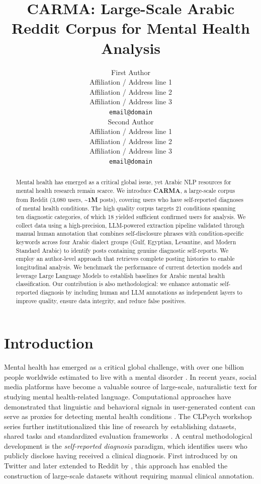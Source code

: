 \documentclass[11pt]{article}
\title{CARMA: Large-Scale Arabic Reddit Corpus for Mental Health Analysis}
\author{First Author \\
  Affiliation / Address line 1 \\
  Affiliation / Address line 2 \\
  Affiliation / Address line 3 \\
  \texttt{email@domain} \\\And
  Second Author \\
  Affiliation / Address line 1 \\
  Affiliation / Address line 2 \\
  Affiliation / Address line 3 \\
  \texttt{email@domain} \\}
\begin{document}
\maketitle
\begin{abstract}
Mental health has emerged as a critical global issue, yet Arabic NLP resources for mental health research remain scarce. We introduce \textbf{CARMA}, a large-scale corpus from Reddit (3,080 users, \textbf{\textasciitilde1M} posts), covering users who have self-reported diagnoses of mental health conditions. The high quality corpus targets 21 conditions spanning ten diagnostic categories, of which 18 yielded sufficient confirmed users for analysis. We collect data using a high-precision, LLM-powered extraction pipeline validated through manual human annotation that combines self-disclosure phrases with condition-specific keywords across four Arabic dialect groups (Gulf, Egyptian, Levantine, and Modern Standard Arabic) to identify posts containing genuine diagnostic self-reports. We employ an author-level approach that retrieves complete posting histories to enable longitudinal analysis. We benchmark the performance of current detection models and leverage Large Language Models to establish baselines for Arabic mental health classification. Our contribution is also methodological: we enhance automatic self-reported diagnosis by including human and LLM annotations as independent layers to improve quality, ensure data integrity, and reduce false positives.\end{abstract}



\section{Introduction}
\label{sec:introduction}
Mental health has emerged as a critical global challenge, with over one billion
people worldwide estimated to live with a mental disorder
\cite{who2025mental}. In recent years, social media platforms have become a valuable source of
large-scale, naturalistic text for studying mental health-related language.
Computational approaches have demonstrated that linguistic and behavioral signals
in user-generated content can serve as proxies for detecting mental health
conditions \cite{de2013predicting, chancellor2020methods}. The CLPsych workshop
series further institutionalized this line of research by establishing datasets, shared tasks and standardized evaluation frameworks \cite{coppersmith2015clpsych}.
A central methodological development is the \textit{self-reported diagnosis}
paradigm, which identifies users who publicly disclose having received a clinical
diagnosis. First introduced by \citet{coppersmith2014quantifying} on Twitter and
later extended to Reddit by \citet{cohan-etal-2018-smhd}, this approach has enabled the
construction of large-scale datasets without requiring manual clinical annotation.
\end{document}
